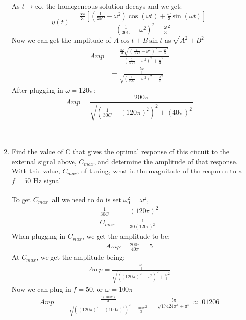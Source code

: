 \documentclass[12pt]{article}
\begin{document}
\begin{enumerate}[label = (\alph*)]
		\noindent As $t \rightarrow \infty$, the homogeneous solution decays and we get:
			$$
			y(t) = \frac{\frac{5\omega}{3}\left[ (\frac{1}{30C} - \omega^2)\cos(\omega t) + \frac{\omega}{3}\sin(\omega t)\right]}{(\frac{1}{30C} - \omega^2)^2 + \frac{\omega}{3}^2}
			$$
		Now we can get the amplitude of $A\cos t + B\sin t$ as $\sqrt{A^2 + B^2}$
			\begin{align*}
				Amp &= \frac{\frac{5\omega}{3}\sqrt{(\frac{1}{30C} - \omega^2)^2 + \frac{\omega}{3}^2}}{(\frac{1}{30C} - \omega^2)^2 + \frac{\omega}{3}^2} \\
				&= \frac{\frac{5\omega}{3}}{\sqrt{(\frac{1}{30C} - \omega^2)^2 + \frac{\omega}{3}^2}}
			\end{align*}
		After plugging in $\omega = 120\pi$:
			$$
			Amp = \frac{200\pi}{\sqrt{(\frac{1}{30C} - (120\pi)^2)^2 + (40\pi)^2}}
			$$
		\\ \\
		\item Find the value of C that gives the optimal response of this circuit to the external signal above, $C_{max}$, and determine the amplitude of that response. With this value, $C_{max}$, of tuning, what is the magnitude of the response to a $f = 50$ Hz signal
		\\ \\
		To get $C_{max}$, all we need to do is set $\omega_0^2 = \omega ^2$,
			\begin{align*}
				\frac{1}{30C} &= (120\pi)^2 \\
				C_{max} &= \frac{1}{30(120\pi)^2}	
			\end{align*}
		When plugging in $C_{max}$, we get the amplitude to be:
			\begin{align*}
				Amp = \frac{200\pi}{40\pi} = 5
			\end{align*}
		At $C_{max}$, we get the amplitude being:
			\begin{align*}
				Amp = \frac{\frac{5\omega}{3}}{\sqrt{((120\pi)^2 - \omega^2)^2 + \frac{\omega}{3}^2}}	
			\end{align*}
		Now we can plug in $f = 50$, or $\omega = 100\pi$
			\begin{align*}
				Amp &= \frac{\frac{5(100\pi)}{3}}{\sqrt{((120\pi)^2 - (100\pi)^2)^2 + \frac{100\pi}{3}^2}}	
				= {\frac {5\pi}{\sqrt {17424\,{\pi}^{4}+{\pi}^{2}}}} \approx .01206
			\end{align*}
	\end{enumerate}	

	
	
	
	
	
	
	
	
	
	
	
	
	
	
	
	
	
	
	
	
	
	
	
	
	
	
	
	
	
	
	
	
\end{document}
